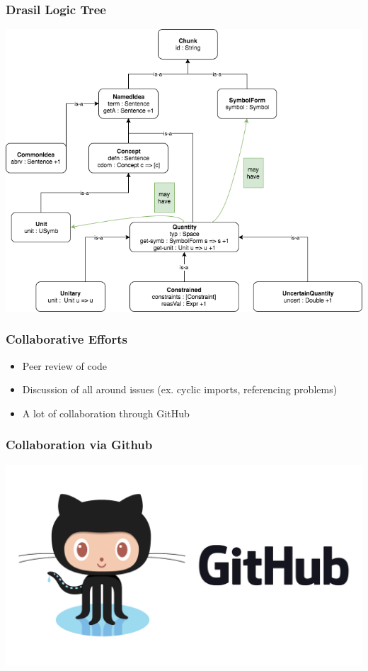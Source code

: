\documentclass{beamer}
\begin{document}
\begin{frame}
\frametitle{Drasil Logic Tree}
\centering
\includegraphics[scale=0.38]{../WG2_11/class_hierarchy.png}

\end{frame}

\begin{frame}
\frametitle{Collaborative Efforts}
\begin{itemize}
 \item<1-> Peer review of code\linebreak
 \item<2-> Discussion of all around issues (ex. cyclic imports, referencing problems)\linebreak
 \item<3-> A lot of collaboration through GitHub\linebreak
\end{itemize}
\end{frame}

\begin{frame}
\frametitle{Collaboration via Github}
\centering
\includegraphics[scale=0.2]{./Github_Logo.png}
\end{frame}
\end{document}
